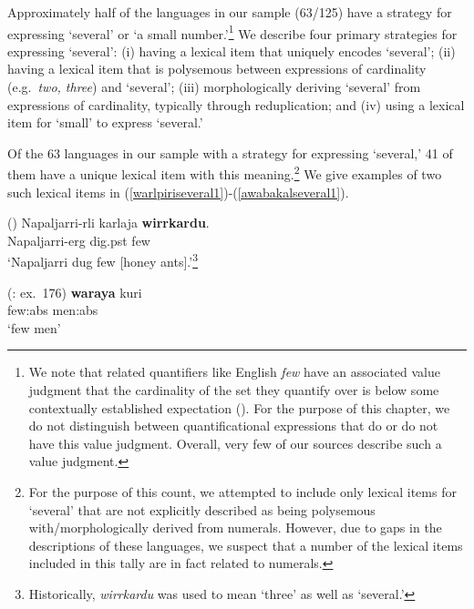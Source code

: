 \documentclass[12pt,egregdoesnotlikesansseriftitles]{scrartcl}
\makeatletter
\newcommand{\ofy}{/125} %
\makeatother
\begin{document}
Approximately half of the languages in our sample (63\ofy) have a strategy for expressing `several' or `a small number.'\footnote{We note that related quantifiers like English {\it few} have an associated value judgment that the cardinality of the set they quantify over is below some contextually established expectation (\citealt{keenan17qu}). For the purpose of this chapter, we do not distinguish between quantificational expressions that do or do not have this value judgment. Overall, very few of our sources describe such a value judgment.} We describe four primary strategies for expressing `several': (i) having a lexical item that uniquely encodes `several'; (ii) having a lexical item that is polysemous between expressions of cardinality (e.g.\ \textit{two, three}) and `several'; (iii) morphologically deriving `several' from expressions of cardinality, typically through reduplication; and (iv) using a lexical item for `small' to express `several.'

Of the 63 languages in our sample with a strategy for expressing `several,' 41 of them have a unique lexical item with this meaning.\footnote{For the purpose of this count, we attempted to include only lexical items for `several' that are not explicitly described as being polysemous with/morphologically derived from numerals. However, due to gaps in the descriptions of these languages, we suspect that a number of the lexical items included in this tally are in fact related to numerals.} We give examples of two such lexical items in (\ref{warlpiriseveral1})-(\ref{awabakalseveral1}).

\begin{exe}
   \hfill(\citealt[9]{bowler17})
  \gll Napaljarri-rli karlaja \textbf{wirrkardu}.\\
  Napaljarri-{\sc erg} dig.{\sc pst} few\\
  \glt `Napaljarri dug few [honey ants].'\footnote{Historically, \textit{wirrkardu} was used to mean `three' as well as `several.'} \label{warlpiriseveral1}
  
   \hfill(\citealt{lissarrague06}:  ex.\ 176)
  \gll \textbf{waraya}   kuri\\
    few:{\sc abs} men:{\sc abs}\\
    `few men' \label{awabakalseveral1}
\end{exe}
\end{document}
